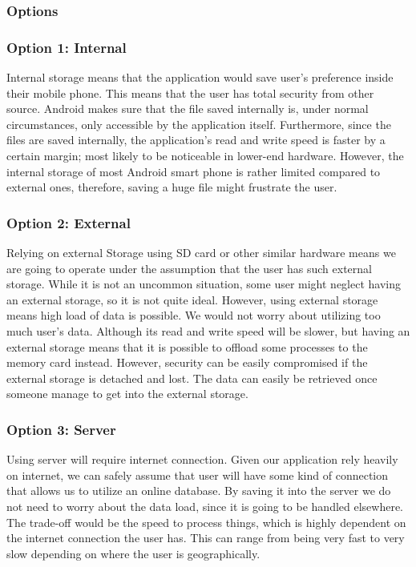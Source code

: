 \documentclass[journal,compsoc, 10pt, draftclsnofoot, onecolumn]{IEEEtran}
\begin{document}
\subsubsection{Options}
\subsubsection*{Option 1: Internal}
Internal storage means that the application would save user's preference inside their
mobile phone. This means that the user has total security from other source. Android
makes sure that the file saved internally is, under normal circumstances, only
accessible by the application itself. Furthermore, since the files are saved
internally, the application's read and write speed is faster by a certain margin;
most likely to be noticeable in lower-end hardware. However, the internal storage of
most Android smart phone is rather limited compared to external ones, therefore,
saving a huge file might frustrate the user.

\subsubsection*{Option 2: External}
Relying on external Storage using SD card or other similar hardware means we are
going to operate under the assumption that the user has such external storage. While
it is not an uncommon situation, some user might neglect having an external storage,
so it is not quite ideal. However, using external storage means high load of data is
possible. We would not worry about utilizing too much user's data. Although its read
and write speed will be slower, but having an external storage means that it is
possible to offload some processes to the memory card instead. However, security can
be easily compromised if the external storage is detached and lost. The data can
easily be retrieved once someone manage to get into the external storage.

\subsubsection*{Option 3: Server}
Using server will require internet connection. Given our application rely heavily on
internet, we can safely assume that user will have some kind of connection that
allows us to utilize an online database. By saving it into the server we do not need
to worry about the data load, since it is going to be handled elsewhere. The
trade-off would be the speed to process things, which is highly dependent on the
internet connection the user has. This can range from being very fast to very slow
depending on where the user is geographically.
\end{document}
